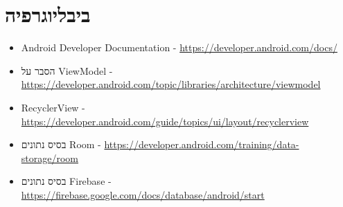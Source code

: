 \chapter{ביבליוגרפיה}
\begin{itemize}\raggedright

  \item Android Developer Documentation - \url{https://developer.android.com/docs/}

  \item הסבר על ViewModel - \url{https://developer.android.com/topic/libraries/architecture/viewmodel}

  \item RecyclerView - \url{https://developer.android.com/guide/topics/ui/layout/recyclerview}

  \item בסיס נתונים Room - \url{https://developer.android.com/training/data-storage/room}

  \item בסיס נתונים Firebase - \url{https://firebase.google.com/docs/database/android/start}
  
\end{itemize}
